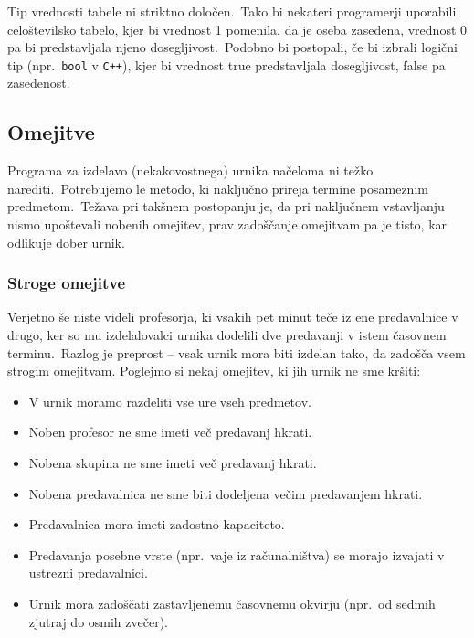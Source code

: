 \documentclass[a4paper]{article}
\begin{document}
Tip vrednosti tabele ni striktno določen.\ Tako bi nekateri programerji uporabili
celoštevilsko tabelo, kjer bi vrednost 1 pomenila, da je oseba zasedena, vrednost 0
pa bi predstavljala njeno dosegljivost.\ Podobno bi postopali, če bi izbrali logični
tip (npr.\ \verb|bool| v \verb|C++|), kjer bi vrednost true predstavljala
dosegljivost, false pa zasedenost.

\subsection{Omejitve} %

Programa za izdelavo (nekakovostnega) urnika načeloma ni težko narediti.\ Potrebujemo
le metodo, ki naključno prireja termine posameznim predmetom.\ Težava pri takšnem postopanju
je, da pri naključnem vstavljanju nismo upoštevali nobenih omejitev, prav zadoščanje omejitvam
pa je tisto, kar odlikuje dober urnik.

\subsubsection{Stroge omejitve} %

Verjetno še niste videli profesorja, ki vsakih pet minut teče iz ene predavalnice v drugo,
ker so mu izdelalovalci urnika dodelili dve predavanji v istem časovnem terminu.\ Razlog
je preprost -- vsak urnik mora biti izdelan tako, da zadošča vsem strogim omejitvam.
Poglejmo si nekaj omejitev, ki jih urnik ne sme kršiti:

\begin{itemize}
   \item V urnik moramo razdeliti vse ure vseh predmetov.
   \item Noben profesor ne sme imeti več predavanj hkrati.
   \item Nobena skupina ne sme imeti več predavanj hkrati.
   \item Nobena predavalnica ne sme biti dodeljena večim predavanjem hkrati.
   \item Predavalnica mora imeti zadostno kapaciteto.
   \item Predavanja posebne vrste (npr.\ vaje iz računalništva) se morajo izvajati v ustrezni predavalnici.
   \item Urnik mora zadoščati zastavljenemu časovnemu okvirju (npr.\ od sedmih zjutraj do osmih zvečer).
\end{itemize}
\end{document}
